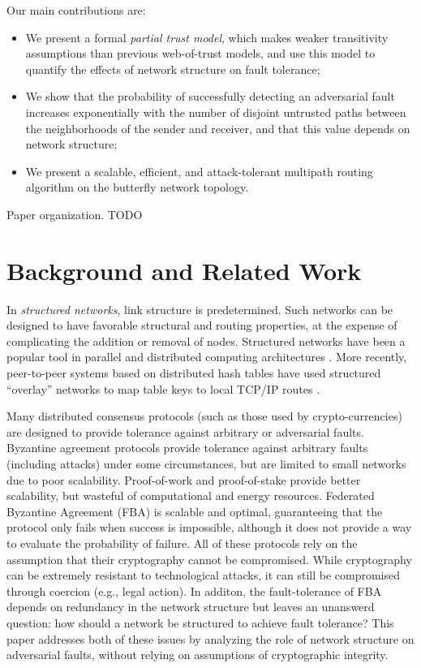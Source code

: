 \documentclass[prodmode,permissions]{acmsmall-ec16}
\begin{document}
Our main contributions are:
\begin{itemize}
\item{We present a formal {\em partial trust model},
which makes weaker transitivity assumptions than previous web-of-trust models,
and use this model to quantify the effects of network structure on
fault tolerance;}
\item{We show that the probability of successfully detecting an
adversarial fault increases exponentially with the number of disjoint untrusted
paths between the neighborhoods of the sender and receiver, and that this
value depends on network structure;}
\item{We present a scalable, efficient, and attack-tolerant multipath
routing algorithm on the butterfly network topology.}
\end{itemize}

Paper organization. TODO

\section{Background and Related Work}

In {\em structured networks}, link structure is predetermined.
Such networks can be designed to have favorable structural and routing properties,
at the expense of complicating the addition or removal of nodes.
Structured networks have been a popular tool in parallel and distributed
computing architectures \cite{kshemkalyani_distributed_2008}.
More recently, peer-to-peer systems based on distributed hash tables have used
structured ``overlay'' networks to map table keys to local TCP/IP routes
\cite{lua_survey_2005}.

Many distributed consensus protocols (such as those used by crypto-currencies)
are designed to provide tolerance against arbitrary or adversarial faults.
Byzantine agreement protocols
\cite{lamport_byzantine_1982,castro_practical_1999}
provide tolerance against arbitrary faults (including attacks) under
some circumstances, but are limited to small networks due to poor scalability.
Proof-of-work \cite{dwork_pricing_1993,nakamoto_bitcoin:_2008}
and proof-of-stake \cite{king_ppcoin:_2012}
provide better scalability, but wasteful of computational and energy
resources.
Federated Byzantine Agreement (FBA) \cite{mazieres_stellar_2015}
is scalable and optimal, guaranteeing that the protocol only fails when
success is impossible, although it does not provide a way to evaluate
the probability of failure.
All of these protocols rely on the assumption that their cryptography
cannot be compromised.
While cryptography can be extremely resistant to technological attacks,
it can still be compromised through coercion (e.g., legal action).
In additon, the fault-tolerance of FBA depends on redundancy in the network structure
but leaves an unanswerd question: how should a network be structured to achieve
fault tolerance?
This paper addresses both of these issues by analyzing the role of network
structure on adversarial faults, without relying on assumptions of cryptographic
integrity.
\end{document}
